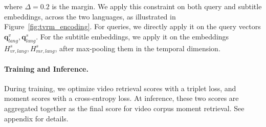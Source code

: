 \noindent
where $\Delta{=}0.2$ is the margin.
We apply this constraint on both query and subtitle embeddings, across the two languages, as illustrated in Figure~\ref{fig:tvrm_encoding}. For queries, we directly apply it on the query vectors $\boldsymbol{q}^{v}_{lang}, \boldsymbol{q}^{s}_{lang}$. For the subtitle embeddings, we apply it on the embeddings $H^{s}_{vr,lang}, H^{s}_{mr,lang}$, after max-pooling them in the temporal dimension.



\paragraph{Training and Inference.}
During training, we optimize video retrieval scores with a triplet loss, and moment scores with a cross-entropy loss. 
At inference, these two scores are aggregated together as the final score for video corpus moment retrieval.
See appendix for details.

